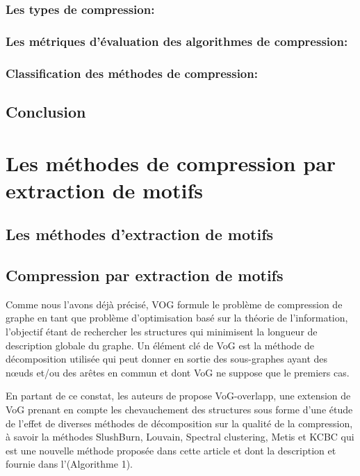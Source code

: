 \documentclass[11pt,a4paper]{report}
\theoremstyle{definition}
\begin{document}
			\subsection{Les types de compression:}
			
			
	
			\subsection{Les métriques d'évaluation des algorithmes de compression:}
				
			
			\subsection{Classification des méthodes de compression:}
			
		\section{Conclusion}
			

\chapter{ Les méthodes de compression par extraction de motifs}
			
						
			
			\section{Les méthodes d'extraction de motifs}
			
			\section{Compression par extraction de motifs}
			Comme nous l'avons déjà précisé, VOG formule le problème de compression de graphe en tant que problème d'optimisation basé sur la théorie de l'information, l'objectif étant de rechercher les structures  qui minimisent la longueur de description globale du graphe. Un élément clé de VoG est la méthode de décomposition utilisée qui peut donner en sortie des sous-graphes ayant des nœuds et/ou des arêtes en commun et dont VoG\citep{koutra2015summarizing} ne suppose que le premiers cas. 
			
			En partant de ce constat, les auteurs de \citep{liu2015empirical} propose VoG-overlapp, une extension de VoG prenant en compte les chevauchement des structures sous forme d'une étude de l'effet de diverses méthodes de décomposition sur la qualité de la compression, à savoir la méthodes SlushBurn, Louvain, Spectral clustering, Metis et KCBC qui est une nouvelle méthode proposée dans cette article et dont la description et fournie dans l'(Algorithme 1).
			
\end{document}
